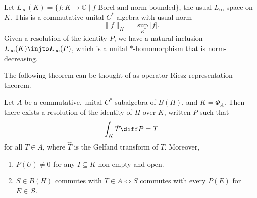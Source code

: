 \documentclass[12pt]{article}
\begin{document}
Let $L_\infty(K) = \{f : K \to \mathbb{C} \mid f\text{ Borel and norm-bounded}\}$, the usual $L_\infty$ space on $K$. This is a commutative unital $C^{\ast}$-algebra with usual norm
\[
\|f\|_K = \sup_K |f|.
\]
Given a resolution of the identity $P$, we have a natural inclusion $L_\infty(K) \injto L_\infty(P)$, which is a unital $\ast$-homomorphism that is norm-decreasing.

The following theorem can be thought of as operator Riesz representation theorem.

\begin{theorem}
	Let $A$ be a commutative, unital $C^{\ast}$-subalgebra of $B(H)$, and $K = \Phi_A$. Then there exists a resolution of the identity of $H$ over $K$, written $P$ such that
	\[
	\int_K \hat T \diff P = T
	\]
	for all $T \in A$, where $\hat T$ is the Gelfand transform of $T$. Moreover,
	\begin{enumerate}[\normalfont(i)]
		\item $P(U) \neq 0$ for any $I \subseteq K$ non-empty and open.
		\item $S \in B(H)$ commutes with $T \in A \iff S$ commutes with every $P(E)$ for $E \in \mathcal{B}$.
	\end{enumerate}
\end{theorem}

\end{document}
